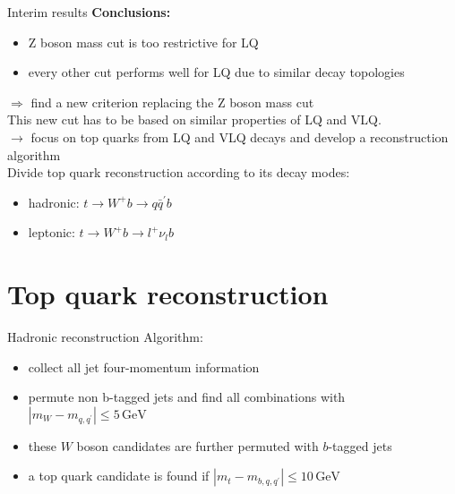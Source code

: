 \documentclass[aspectratio=1610, professionalfonts, 9pt]{beamer}
\begin{document}
\begin{frame}{Interim results}
    \textbf{Conclusions:}
    \begin{itemize}
        \item Z boson mass cut is too restrictive for LQ
        \item every other cut performs well for LQ due to similar decay topologies
    \end{itemize}
    \(\Rightarrow\) find a new criterion replacing the Z boson mass cut \\
    \vspace{3mm}
    This new cut has to be based on similar properties of LQ and VLQ. \\
    \(\rightarrow\) focus on top quarks from LQ and VLQ decays and develop a reconstruction algorithm \\
    \vspace{3mm}
    Divide top quark reconstruction according to its decay modes:
    \begin{itemize}
        \item hadronic: \(t \rightarrow W^{+} b \rightarrow q \bar{q}^{'} b \)
        \item leptonic: \(t \rightarrow W^{+} b \rightarrow l^{+} \nu_{l} b \)
    \end{itemize}
\end{frame}
\section{Top quark reconstruction}

\begin{frame}{Hadronic reconstruction}
    Algorithm:
    \begin{itemize}
        \item collect all jet four-momentum information
        \item permute non b-tagged jets and find all combinations with \(|m_{W}-m_{q,q^{'}}| \le 5\,\mathrm{GeV}\)
        \item these \(W\) boson candidates are further permuted with \(b\)-tagged jets
        \item a top quark candidate is found if \(|m_{t}-m_{b,q,q^{'}}| \le 10\,\mathrm{GeV}\)
    \end{itemize}
\end{frame}
\end{document}
